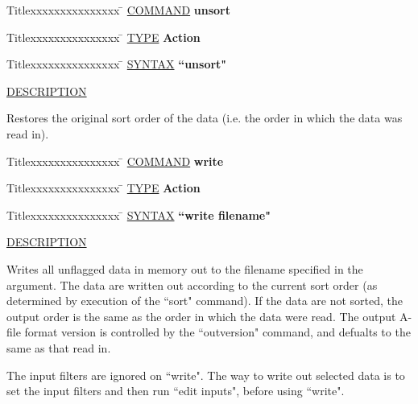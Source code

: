 \begin{tabbing}
Titlexxxxxxxxxxxxxxx \= \kill
\underline{COMMAND} \> {\bf 	unsort} \\
\end{tabbing}

\begin{tabbing}
Titlexxxxxxxxxxxxxxx \= \kill
\underline{TYPE} \> {\bf 		Action} \\
\end{tabbing}

\begin{tabbing}
Titlexxxxxxxxxxxxxxx \= \kill
\underline{SYNTAX} \> {\bf 		``unsort"} \\
\end{tabbing}

\underline{DESCRIPTION}
\begin{list}{}{\setlength{\leftmargin}{0.5in}
     \setlength{\rightmargin}{0in}}
\item
Restores the original sort order of the data (i.e. the
order in which the data was read in).
\end{list}
\vspace{.2in}

\begin{tabbing}
Titlexxxxxxxxxxxxxxx \= \kill
\underline{COMMAND} \> {\bf 	write} \\
\end{tabbing}

\begin{tabbing}
Titlexxxxxxxxxxxxxxx \= \kill
\underline{TYPE} \> {\bf 		Action} \\
\end{tabbing}

\begin{tabbing}
Titlexxxxxxxxxxxxxxx \= \kill
\underline{SYNTAX} \> {\bf 		``write filename"} \\
\end{tabbing}

\underline{DESCRIPTION}
\begin{list}{}{\setlength{\leftmargin}{0.5in}
     \setlength{\rightmargin}{0in}}
\item
Writes all unflagged data in memory out to the filename
specified in the argument.  The data are written out
according to the current sort order (as determined by
execution of the ``sort" command).  If the data are not
sorted, the output order is the same as the order in
which the data were read.  The output A-file format version
is controlled by the ``outversion" command, and defualts to 
the same as that read in.
\item
The input filters are ignored on ``write".
The way to write out selected data is to set the input
filters and then run ``edit inputs", before using ``write".
\end{list}
\vspace{.2in}

